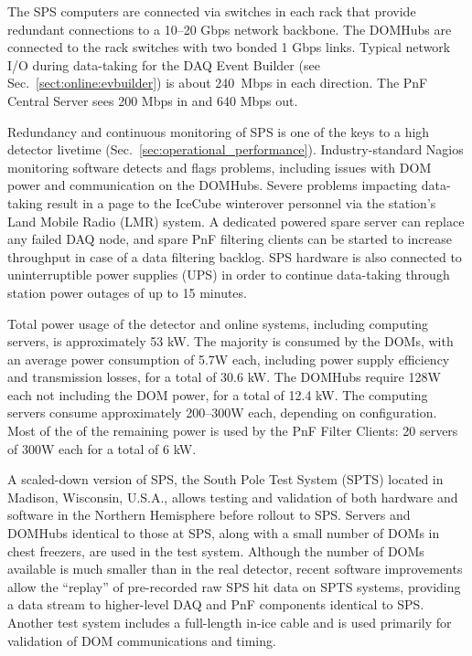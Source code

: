 The SPS computers are connected via switches in each rack that provide
redundant connections to a 10--20 Gbps network backbone.  The DOMHubs are
connected to the rack switches with two bonded 1 Gbps links.  Typical network I/O during
data-taking for the DAQ Event Builder (see
Sec.~\ref{sect:online:evbuilder}) is about 240~Mbps in each direction.
The PnF Central Server sees 200 Mbps in and 640 Mbps out.

Redundancy and continuous monitoring of SPS is one of the keys to a high
detector livetime (Sec.~\ref{sec:operational_performance}).
Industry-standard Nagios monitoring software detects and flags problems, 
including issues with DOM power and communication on the DOMHubs.  Severe
problems impacting data-taking result in a page to the IceCube winterover 
personnel via the station's Land Mobile Radio (LMR) system.  A dedicated
powered spare server can replace any failed DAQ node, and spare PnF filtering
clients can be started to increase throughput in case of a data filtering
backlog.  SPS hardware is also connected to uninterruptible
power supplies (UPS) in order to continue data-taking through station power
outages of up to 15 minutes.

Total power usage of the detector and online systems, including computing servers, is
approximately 53 kW.  The majority is consumed by the DOMs, with an
average power consumption of 5.7W each, including power supply efficiency
and transmission losses, for a total of 30.6 kW.  The DOMHubs require 128W
each not including the DOM power, for a total of 12.4 kW.  The
computing servers consume approximately 200--300W each, depending on
configuration.  Most of the of the remaining power is used by the PnF
Filter Clients: 20 servers of 300W each for a total of 6 kW.

A scaled-down version of SPS, the South Pole Test System (SPTS) located in
Madison, Wisconsin, U.S.A., allows testing and validation of both hardware
and software in the Northern Hemisphere before rollout to SPS.  Servers and DOMHubs
identical to those at SPS, along with a small number of DOMs in chest
freezers, are used in the test system.  Although the number of DOMs
available is much smaller than in the real detector, recent software
improvements allow the ``replay'' of pre-recorded raw SPS hit data
on SPTS systems, providing a data stream to higher-level DAQ and PnF
components identical to SPS.  Another test system includes a full-length
in-ice cable and is used primarily for validation of DOM communications and
timing.

